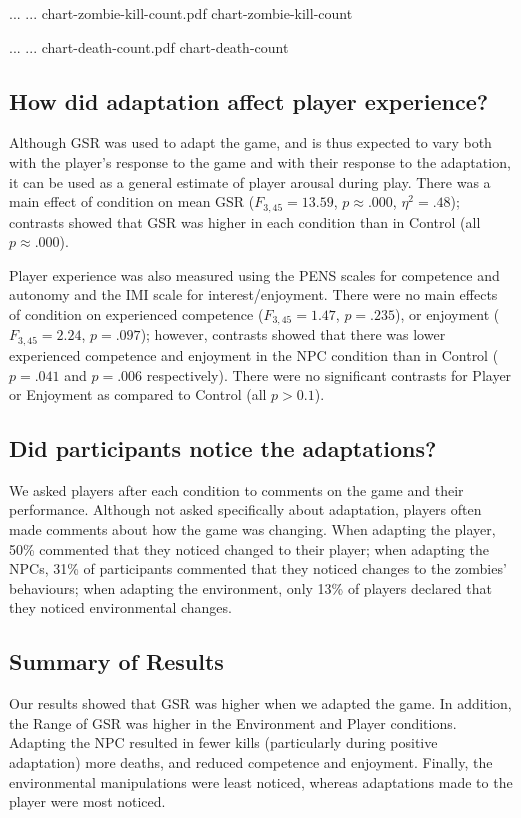 \img
{...}
{...}
{chart-zombie-kill-count.pdf}
{chart-zombie-kill-count}

\img
{...}
{...}
{chart-death-count.pdf}
{chart-death-count}

\subsection{How did adaptation affect player experience?}

Although GSR was used to adapt the game, and is thus expected to vary both with the player’s response to the game and with their response to the adaptation, it can be used as a general estimate of player arousal during play. There was a main effect of condition on mean GSR ($F_{3,45} = 13.59$, $p \approx .000$, $\eta^{2} = .48$); contrasts showed that GSR was higher in each condition than in Control (all $p \approx .000$).

Player experience was also measured using the PENS scales for competence and autonomy and the IMI scale for interest/enjoyment. There were no main effects of condition on experienced competence ($F_{3,45} = 1.47$, $p = .235$), or enjoyment ($F_{3,45} = 2.24$, $p = .097$); however, contrasts showed that there was lower experienced competence and enjoyment in the NPC condition than in Control ($p = .041$ and $p = .006$ respectively). There were no significant contrasts for Player or Enjoyment as compared to Control (all $p > 0.1$).

\subsection{Did participants notice the adaptations?}

We asked players after each condition to comments on the game and their performance. Although not asked specifically about adaptation, players often made comments about how the game was changing. When adapting the player, 50\% commented that they noticed changed to their player; when adapting the NPCs, 31\% of participants commented that they noticed changes to the zombies’ behaviours; when adapting the environment, only 13\% of players declared that they noticed environmental changes.

\subsection{Summary of Results}

Our results showed that GSR was higher when we adapted the game. In addition, the Range of GSR was higher in the Environment and Player conditions. Adapting the NPC resulted in fewer kills (particularly during positive adaptation) more deaths, and reduced competence and enjoyment. Finally, the environmental manipulations were least noticed, whereas adaptations made to the player were most noticed.


